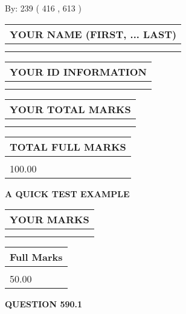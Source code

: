 \documentclass[12pt]{article}
\begin{document}
   
\hspace{1.0in} By: 
 239 ( 416 ,  613 )
   
   
   
   
\newpage 
\setcounter{page}{ 
   590001 } 
   
   
   
   
\noindent\begin{tabular}{|l|}
\hline
YOUR NAME (FIRST, ... LAST)  \\
\hline
 \\ 
 \\ 
\hline
\end{tabular}
\hspace{0.05in} \begin{tabular}{|l|}
\hline
 YOUR   ID   INFORMATION  \\
\hline
 \\ 
 \\ 
\hline
\end{tabular}
   
   
\vspace{0.2in}\noindent\begin{tabular}{|l|}
\hline
YOUR TOTAL MARKS  \\
\hline
 \\ 
 \\ 
\hline
\end{tabular}
\hspace{0.05in} \begin{tabular}{|l|}
\hline
TOTAL FULL MARKS  \\
\hline
 \\ 
100.00 \\
\hline
\end{tabular}
   
   
 \vspace{0.2in}
{\LARGE {\textbf{ A QUICK TEST EXAMPLE}}}
   
   
  
\vspace{0.2in}
  
\noindent\begin{tabular}{|l|}
\hline
 YOUR MARKS  \\
\hline
 \\ 
 \\ 
\hline
\end{tabular}
\hspace{0.05in} \begin{tabular}{|l|}
\hline
 Full Marks  \\
\hline
 \\ 
50.00 \\
\hline
\end{tabular}
{\textbf{\Large{QUESTION
590.1 
}}}
  
\end{document}
